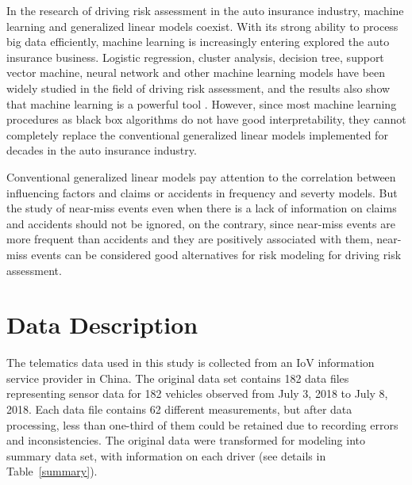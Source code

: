 \documentclass[entropy,article,submit,moreauthors,LaTeX and dvi2pdf]{Definitions/mdpi}
\begin{document}
In the research of driving risk assessment in the auto insurance industry, machine learning and generalized linear models coexist. With its strong ability to process big data efficiently, machine learning is increasingly entering explored the auto insurance business. Logistic regression\cite{jin2018latent}, cluster analysis\cite{carfora2019pay}, decision tree\cite{paefgen2013evaluation}, support vector machine\cite{burton2016driver}, neural network\cite{baecke2017value} and other machine learning models\cite{guelman2012gradient,bian2018good,jafarnejad2017towards} have been widely studied in the field of driving risk assessment, and the results also show that machine learning is a powerful tool \cite{paefgen2014multivariate}. However, since most machine learning procedures as black box algorithms do not have good interpretability, they cannot completely replace the conventional generalized linear models implemented for decades in the auto insurance industry\cite{pesantez2019predicting}.

Conventional generalized linear models pay attention to the correlation between influencing factors and claims or accidents in frequency and severty models\cite{boucher2013pay,verbelen2018unravelling,ma2018use,guillen2019use}. But the study of near-miss events even when there is a lack of information on claims and accidents should not be ignored\cite{wang2015driving,guillen2020can}, on the contrary, since near-miss events are more frequent than accidents and they are positively associated with them, near-miss events can be considered good alternatives for risk modeling for driving risk assessment.
\section{Data Description}
The telematics data used in this study is collected from an IoV information service provider in China. The original data set contains 182 data files representing sensor data for 182 vehicles observed from July 3, 2018 to July 8, 2018\cite{sun2020assessing}. Each data file contains 62 different measurements, but after data processing\cite{sun2019cleaning}, less than one-third of them could be retained due to recording errors and inconsistencies. The original data were transformed for modeling into summary data set, with  information on each driver (see details in Table~\ref{summary}).
\end{document}
